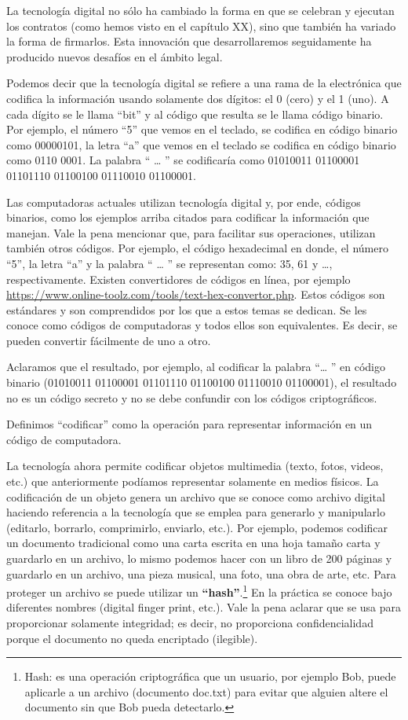 \documentclass[12pt]{report} %
\begin{document}
\begin{itemize}
La tecnología digital no sólo ha cambiado la forma en que se celebran y ejecutan los contratos (como hemos visto en el capítulo XX), sino que también ha variado la forma de firmarlos. Esta innovación que desarrollaremos seguidamente ha producido nuevos desafíos en el ámbito legal. 

Podemos decir que la tecnología digital se refiere a una rama de la electrónica que codifica la información usando solamente dos dígitos: el 0 (cero) y el 1 (uno).  A cada dígito se le llama “bit” y al código que resulta se le llama código binario. Por ejemplo, el número “5” que vemos en el teclado, se codifica en código binario como 00000101, la letra “a” que vemos en el teclado se codifica en código binario como 0110 0001. La palabra “ … ” se codificaría como 01010011 01100001 01101110 01100100 01110010 01100001.  

Las computadoras actuales utilizan tecnología digital y, por ende, códigos binarios, como los ejemplos arriba citados para codificar la información que manejan. Vale la pena mencionar que, para facilitar sus operaciones, utilizan también otros códigos. Por ejemplo, el código hexadecimal en donde, el número “5”, la letra “a” y la palabra “ … ” se representan como: 35, 61 y …, respectivamente.  Existen convertidores de códigos en línea, por ejemplo \url{https://www.online-toolz.com/tools/text-hex-convertor.php}. Estos códigos son estándares y son comprendidos por los que a estos temas se dedican. Se les conoce como códigos de computadoras y todos ellos son equivalentes. Es decir, se pueden convertir fácilmente de uno a otro.

Aclaramos que el resultado, por ejemplo, al codificar la palabra “… ” en código binario  (01010011 01100001 01101110 01100100 01110010 01100001), el resultado no es un código secreto y no se debe confundir con los códigos criptográficos.

Definimos “codificar” como la operación para representar información en un código de computadora.

La tecnología ahora permite codificar objetos multimedia (texto, fotos, videos, etc.) que anteriormente podíamos representar solamente en medios físicos. La codificación de un objeto genera un archivo que se conoce como archivo digital haciendo referencia a la tecnología que se emplea para generarlo y manipularlo (editarlo, borrarlo, comprimirlo, enviarlo, etc.). Por ejemplo, podemos codificar un documento tradicional como una carta escrita en una hoja tamaño carta y guardarlo en un archivo, lo mismo podemos hacer con un libro de 200 páginas y guardarlo en un archivo, una pieza musical, una foto, una obra de arte, etc. Para proteger un archivo se puede utilizar un \textbf{“hash”}.\footnote{Hash: es una operación criptográfica que un usuario, por ejemplo Bob, puede aplicarle a un archivo (documento doc.txt) para evitar que alguien altere el documento sin que Bob pueda detectarlo. }  En la práctica se conoce bajo diferentes nombres (digital finger print, etc.). Vale la pena aclarar que se usa para proporcionar solamente integridad; es decir, no proporciona confidencialidad porque el documento no queda encriptado (ilegible). 


\end{itemize}
\end{document}
